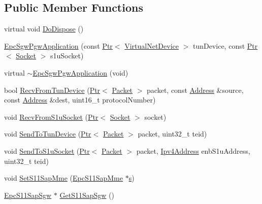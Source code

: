 \subsection*{Public Member Functions}
\begin{DoxyCompactItemize}
\item 
virtual void \hyperlink{classns3_1_1EpcSgwPgwApplication_a8cec25fb185f15c9862a1f1e31c66525}{Do\+Dispose} ()
\item 
\hyperlink{classns3_1_1EpcSgwPgwApplication_a0e8cdb651b4f5327d32d9a5bc52d6717}{Epc\+Sgw\+Pgw\+Application} (const \hyperlink{classns3_1_1Ptr}{Ptr}$<$ \hyperlink{classns3_1_1VirtualNetDevice}{Virtual\+Net\+Device} $>$ tun\+Device, const \hyperlink{classns3_1_1Ptr}{Ptr}$<$ \hyperlink{classns3_1_1Socket}{Socket} $>$ s1u\+Socket)
\item 
virtual \hyperlink{classns3_1_1EpcSgwPgwApplication_a0ca75fd4a63ac1a7f4875f7ca7e2ffdf}{$\sim$\+Epc\+Sgw\+Pgw\+Application} (void)
\item 
bool \hyperlink{classns3_1_1EpcSgwPgwApplication_aeea285ccd04a4350e4ddb77a359e97ca}{Recv\+From\+Tun\+Device} (\hyperlink{classns3_1_1Ptr}{Ptr}$<$ \hyperlink{classns3_1_1Packet}{Packet} $>$ packet, const \hyperlink{classns3_1_1Address}{Address} \&source, const \hyperlink{classns3_1_1Address}{Address} \&dest, uint16\+\_\+t protocol\+Number)
\item 
void \hyperlink{classns3_1_1EpcSgwPgwApplication_adab529c65e1174c5568016cc91e5dedd}{Recv\+From\+S1u\+Socket} (\hyperlink{classns3_1_1Ptr}{Ptr}$<$ \hyperlink{classns3_1_1Socket}{Socket} $>$ socket)
\item 
void \hyperlink{classns3_1_1EpcSgwPgwApplication_a7c2922506ab9a7d14ebb83d8887c9faf}{Send\+To\+Tun\+Device} (\hyperlink{classns3_1_1Ptr}{Ptr}$<$ \hyperlink{classns3_1_1Packet}{Packet} $>$ packet, uint32\+\_\+t teid)
\item 
void \hyperlink{classns3_1_1EpcSgwPgwApplication_a32232c4e589789e118db44c4883cebb1}{Send\+To\+S1u\+Socket} (\hyperlink{classns3_1_1Ptr}{Ptr}$<$ \hyperlink{classns3_1_1Packet}{Packet} $>$ packet, \hyperlink{classns3_1_1Ipv4Address}{Ipv4\+Address} enb\+S1u\+Address, uint32\+\_\+t teid)
\item 
void \hyperlink{classns3_1_1EpcSgwPgwApplication_af135dedf794394760179db0de9ba47ea}{Set\+S11\+Sap\+Mme} (\hyperlink{classns3_1_1EpcS11SapMme}{Epc\+S11\+Sap\+Mme} $\ast$\hyperlink{generate__test__data__lte__sinr_8m_ad83eeb3a142285d1243a08c6b7026df8}{s})
\item 
\hyperlink{classns3_1_1EpcS11SapSgw}{Epc\+S11\+Sap\+Sgw} $\ast$ \hyperlink{classns3_1_1EpcSgwPgwApplication_af709794f4a8bfbdccd451261d4525570}{Get\+S11\+Sap\+Sgw} ()

\end{DoxyCompactItemize}
